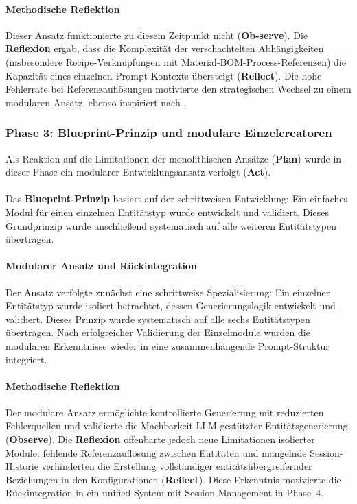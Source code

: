 \paragraph{Methodische Reflektion}

Dieser Ansatz funktionierte zu diesem Zeitpunkt nicht (\textbf{Ob-serve}). Die \textbf{Reflexion} ergab, dass die Komplexität der verschachtelten Abhängigkeiten (insbesondere Recipe-Verknüpfungen mit Material-BOM-Process-Referenzen) die Kapazität eines einzelnen Prompt-Kontexts übersteigt (\textbf{Reflect}). Die hohe Fehlerrate bei Referenzauflösungen motivierte den strategischen Wechsel zu einem modularen Ansatz, ebenso inspiriert nach \cite{openai:sora_android2025}.

\subsubsection{Phase 3: Blueprint-Prinzip und modulare Einzelcreatoren}
\label{subsubsec:Phase3}

Als Reaktion auf die Limitationen der monolithischen Ansätze (\textbf{Plan}) wurde in dieser Phase ein modularer Entwicklungsansatz verfolgt (\textbf{Act}).
\\\\
Das \textbf{Blueprint-Prinzip} basiert auf der schrittweisen Entwicklung: Ein einfaches Modul für einen einzelnen Entitätstyp wurde entwickelt und validiert. Dieses Grundprinzip wurde anschließend systematisch auf alle weiteren Entitätstypen übertragen.

\paragraph{Modularer Ansatz und Rückintegration}

Der Ansatz verfolgte zunächst eine schrittweise Spezialisierung: Ein einzelner Entitätstyp wurde isoliert betrachtet, dessen Generierungslogik entwickelt und validiert. Dieses Prinzip wurde systematisch auf alle sechs Entitätstypen übertragen. Nach erfolgreicher Validierung der Einzelmodule wurden die modularen Erkenntnisse wieder in eine zusammenhängende Prompt-Struktur integriert.

\paragraph{Methodische Reflektion}

Der modulare Ansatz ermöglichte kontrollierte Generierung mit reduzierten Fehlerquellen und validierte die Machbarkeit LLM-gestützter Entitätsgenerierung (\textbf{Observe}). Die \textbf{Reflexion} offenbarte jedoch neue Limitationen isolierter Module: fehlende Referenzauflösung zwischen Entitäten und mangelnde Session-Historie verhinderten die Erstellung vollständiger entitätsübergreifernder Beziehungen in den Konfigurationen (\textbf{Reflect}). Diese Erkenntnis motivierte die Rückintegration in ein unified System mit Session-Management in Phase~4.

